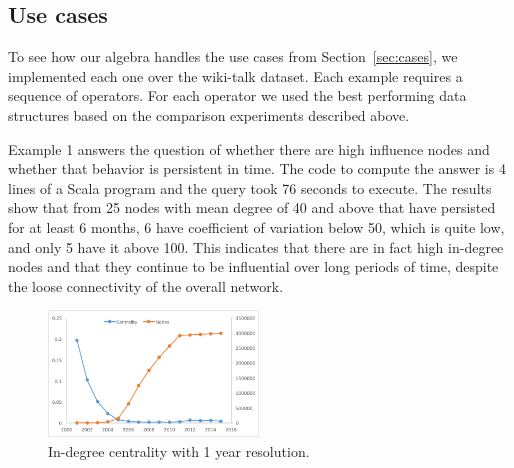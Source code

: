 \subsection{Use cases}
\label{sec:exp:cases}

To see how our algebra handles the use cases from
Section~\ref{sec:cases}, we implemented each one over the wiki-talk
dataset.  Each example requires a sequence of operators.  For each
operator we used the best performing data structures based on the
comparison experiments described above.

Example 1 answers the question of whether there are high influence
nodes and whether that behavior is persistent in time.  The code to
compute the answer is 4 lines of a Scala program and the query took 76
seconds to execute.  The results show that from 25 nodes with mean
degree of 40 and above that have persisted for at least 6 months, 6
have coefficient of variation below 50, which is quite low, and only 5
have it above 100.  This indicates that there are in fact high
in-degree nodes and that they continue to be influential over long
periods of time, despite the loose connectivity of the overall
network.


\begin{figure}
\centering
\includegraphics[width=2.2in]{figs/centrality.png}
\caption{In-degree centrality with 1 year resolution.}
\label{fig:central}
\end{figure}

